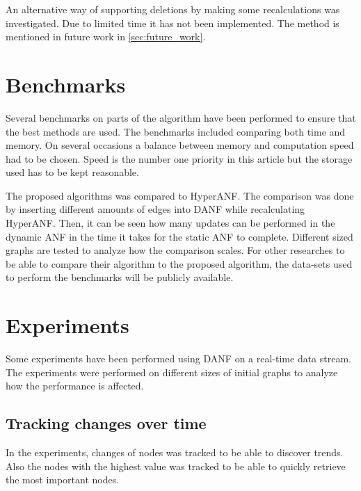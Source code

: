 An alternative way of supporting deletions by making some recalculations was investigated. Due to limited time it has not been implemented. The method is mentioned in future work in \ref{sec:future_work}.

\section{Benchmarks} 
Several benchmarks on parts of the algorithm have been performed to ensure that the best methods are used. The benchmarks included comparing both time and memory. On several occasions a balance between memory and computation speed had to be chosen. Speed is the number one priority in this article but the storage used has to be kept reasonable. 

The proposed algorithms was compared to HyperANF. The comparison was done by inserting different amounts of edges into DANF while recalculating HyperANF.  Then, it can be seen how many updates can be performed in the dynamic ANF in the time it takes for the static ANF to complete. Different sized graphs are tested to analyze how the comparison scales. For other researches to be able to compare their algorithm to the proposed algorithm, the data-sets used to perform the benchmarks will be publicly available.


\section{Experiments}
Some experiments have been performed using DANF on a real-time data stream. The experiments were performed on different sizes of initial graphs to analyze how the performance is affected.  

\subsection{Tracking changes over time}
In the experiments, changes of nodes was tracked to be able to discover trends. Also the nodes with the highest value was tracked to be able to quickly retrieve the most important nodes. 


